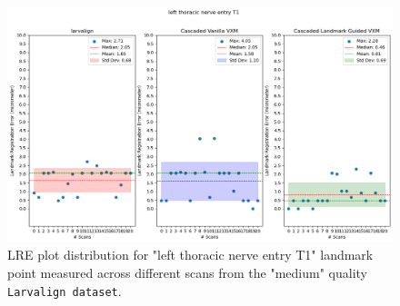 \documentclass{book}
\begin{document}
	\begin{figure}[h!]
		\centering
		\includegraphics[width=0.75\columnwidth]{resources/chapter5_fresh/output/left thoracic nerve entry T1.png}
		\caption{LRE plot distribution for "left thoracic nerve entry T1" landmark point measured across different scans from the "medium" quality \texttt{Larvalign dataset}.}
		\label{fig:landmark30}
	\end{figure}
	
	
	
\end{document}
